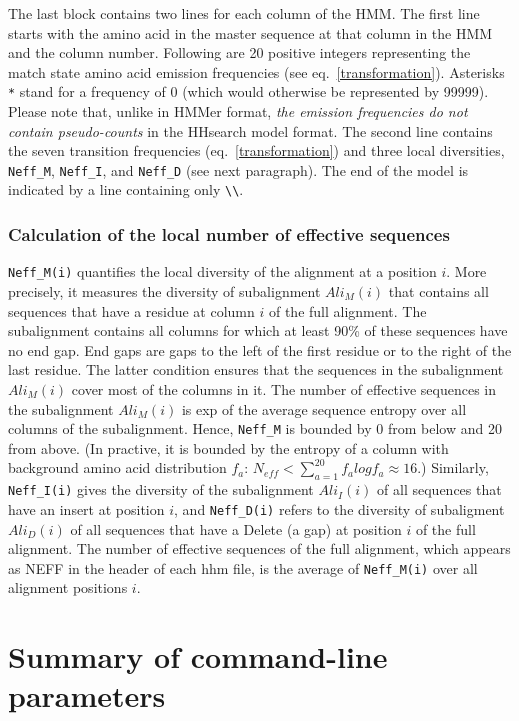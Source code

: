 \documentclass[11pt,a4paper]{article}
\begin{document}
The last block contains two lines for each column of the HMM. The first line starts with the amino acid in the master sequence at that column in the HMM and the column number. Following are 20  positive integers representing the match state amino acid emission frequencies (see eq.\ \ref{transformation}). Asterisks \verb`*` stand for a frequency of 0 (which would otherwise be represented by 99999). Please note that, unlike in HMMer format,  \emph{the emission frequencies do not contain pseudo-counts} in the HHsearch model format. The second line contains the seven transition frequencies (eq.\ \ref{transformation}) and three local diversities, \verb`Neff_M`, \verb`Neff_I`, and \verb`Neff_D` (see next paragraph). The end of the model is indicated by a line containing only \verb`\\`.

\subsubsection*{Calculation of the local number of effective sequences}

\verb`Neff_M(i)` quantifies the local diversity of the alignment at a position $i$. More precisely, it measures the diversity of subalignment $Ali_M(i)$ that contains all sequences that have a residue at column $i$ of the full alignment. The subalignment contains all columns for which at least 90\% of these sequences have no end gap. End gaps are gaps to the left of the first residue or to the right of the last residue. The latter condition ensures that the sequences in the subalignment $Ali_M(i)$ cover most of the columns in it. The number of effective sequences in the subalignment $Ali_M(i)$ is exp of the average sequence entropy over all columns of the subalignment. Hence, \verb`Neff_M` is bounded by 0 from below and 20 from above. (In practive, it is bounded by the entropy of a column with background amino acid distribution $f_a$: $N_{eff} < \sum_{a=1}^{20} f_a log f_a \approx 16$.) Similarly, \verb`Neff_I(i)` gives the diversity of the subalignment $Ali_I(i)$ of all sequences that have an insert at position $i$, and \verb`Neff_D(i)` refers to the diversity of subaligment $Ali_D(i)$ of all sequences that have a Delete (a gap) at position $i$ of the full alignment. The number of effective sequences of the full alignment, which appears as NEFF in the header of each hhm file, is the average of \verb`Neff_M(i)` over all alignment positions $i$.


\section{Summary of command-line parameters}
\end{document}

